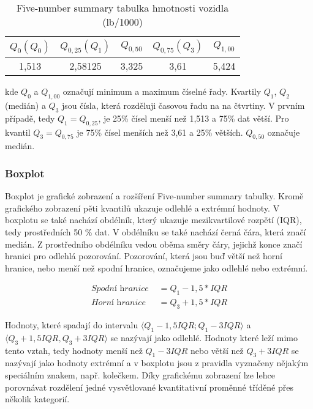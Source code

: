 \begin{table}[H]

    \centering
    \begin{tabular}[t]{c|c|c|c|c}
        \hline
        $Q_{0} (Q_0)$ & $Q_{0,25} (Q_1) $ & $Q_{0,50}$ & $Q_{0,75} (Q_3)$ & $Q_{1,00}$\\
        \hline
        1,513 & 2,58125 & 3,325 & 3,61 & 5,424\\
        \hline
    \end{tabular}
    \caption{\label{tab:five-number_summary}Five-number summary tabulka hmotnosti vozidla (lb/1000)}
\end{table}

kde $Q_{0}$ a $Q_{1,00}$ označují minimum a maximum číselné řady. Kvartily $Q_{1}$, $Q_{2}$ (medián) a $Q_{3}$ jsou čísla, která rozděluji časovou řadu na na čtvrtiny. V prvním
případě, tedy $Q_1 = Q_{0,25}$, je 25\% čísel menší než 1,513 a 75\% dat větší. Pro kvantil $Q_3 = Q_{0,75}$ je 75\% čísel menších než 3,61 a 25\% větších. $Q_{0,50}$ označuje medián.

\subsubsection{Boxplot}
Boxplot je grafické zobrazení a rozšíření Five-number summary tabulky. Kromě grafického zobrazení 
pěti kvantilů  ukazuje odlehlé a extrémní hodnoty.
V boxplotu se také nachází obdélník, který ukazuje mezikvartilové rozpětí (IQR), tedy prostředních 50 \% dat. V obdélníku se také nachází černá čára, která značí medián.
{\color{red}
Z prostředního obdélníku vedou oběma směry čáry, jejichž konce značí hranici pro odlehlá pozorování.
Pozorování, která jsou buď větší než horní hranice, nebo menší než spodní hranice, označujeme jako odlehlé nebo extrémní. 
}

\begin{align}
    \textit{Spodní hranice } &= Q_1 - 1,5 * IQR \\
    \textit{Horní hranice } &= Q_3 + 1,5 * IQR
\end{align}

Hodnoty, které spadají do intervalu $\langle Q_1 - 1,5IQR; Q_1 - 3IQR\rangle$ a $\langle Q_3 + 1,5IQR, Q_3 + 3IQR \rangle$ se nazývají jako odlehlé.
Hodnoty které leží mimo tento vztah, tedy hodnoty menší než $Q_1 - 3IQR$ nebo větší než $Q_3 + 3IQR$ se nazývají jako hodnoty extrémní a
v boxplotu jsou z pravidla vyznačeny nějakým speciálním znakem, např. kolečkem.
Díky grafickému zobrazení lze lehce porovnávat rozdělení jedné vysvětlované kvantitativní proměnné tříděné přes několik kategorií.

